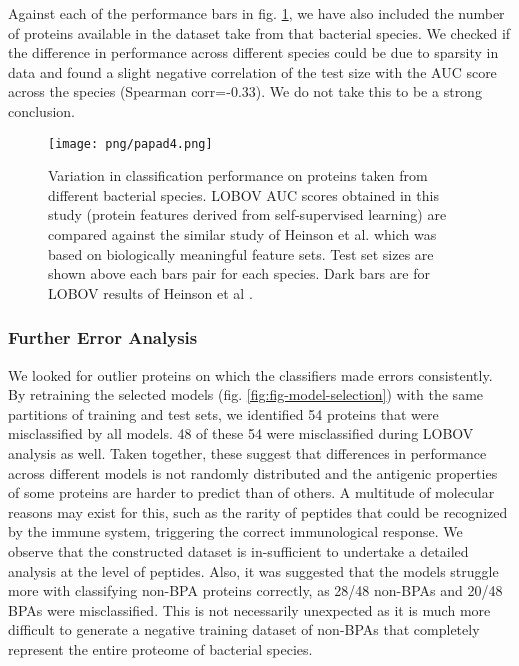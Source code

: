 \documentclass[10pt,journal,compsoc,twoside]{IEEEtran}
\begin{document}
Against each of the performance bars in fig. \ref{fig:fig-lobov}, we have also included the number of proteins available in the dataset take from that bacterial species. We checked if the difference in performance across different species could be due to sparsity in data and found a slight negative correlation of the test size with the AUC score across the species (Spearman corr=-0.33). We do not take this to be a strong conclusion.

\begin{figure}[!t]
\centering
\texttt{[image: png/papad4.png]}
\caption{Variation in classification performance on proteins taken from different bacterial species. LOBOV AUC scores obtained in this study (protein features derived from self-supervised learning) are compared against the similar study of Heinson et al. \cite{heinson_2019} which was based on biologically meaningful feature sets. Test set sizes are shown above each bars pair for each species. Dark bars are for LOBOV results of Heinson et al \cite{heinson_2019}.}
\label{fig:fig-lobov}
\end{figure}

\subsubsection{Further Error Analysis}
\label{sec:lobov}

We looked for outlier proteins on which the classifiers made errors consistently. By retraining the selected models (fig. \ref{fig:fig-model-selection}) with the same partitions of training and test sets, we identified 54 proteins that were misclassified by all models. 48 of these 54 were misclassified during LOBOV analysis as well. Taken together, these suggest that differences in performance across different models is not randomly distributed and the antigenic properties of some proteins are harder to predict than of others. A multitude of molecular reasons may exist for this, such as the rarity of peptides that could be recognized by the immune system, triggering the correct immunological response. We observe that the constructed dataset is in-sufficient to undertake a detailed analysis at the level of peptides. Also, it was suggested that the models struggle more with classifying non-BPA proteins correctly, as 28/48 non-BPAs and 20/48 BPAs were misclassified. This is not necessarily unexpected as it is much more difficult to generate a negative training dataset of non-BPAs that completely represent the entire proteome of bacterial species. 
\end{document}
